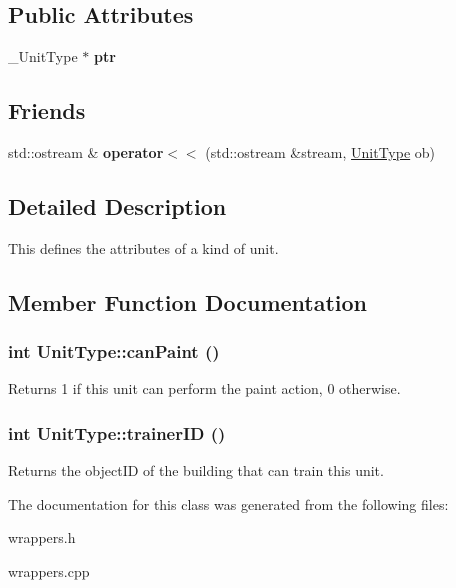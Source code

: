 \subsection*{Public Attributes}
\begin{CompactItemize}
\item 
\hypertarget{classUnitType_42bb83a6d9ad668ce229e4ee19e7ce0b}{
\_\-UnitType $\ast$ \textbf{ptr}}
\label{classUnitType_42bb83a6d9ad668ce229e4ee19e7ce0b}

\end{CompactItemize}
\subsection*{Friends}
\begin{CompactItemize}
\item 
\hypertarget{classUnitType_741d0ed0451b24d98ac791f3f25ad6cd}{
std::ostream \& \textbf{operator$<$$<$} (std::ostream \&stream, \hyperlink{classUnitType}{UnitType} ob)}
\label{classUnitType_741d0ed0451b24d98ac791f3f25ad6cd}

\end{CompactItemize}


\subsection{Detailed Description}
This defines the attributes of a kind of unit. 

\subsection{Member Function Documentation}
\hypertarget{classUnitType_8be8091a55003a0901f30d7600e2d0a6}{
\subsubsection[{canPaint}]{\setlength{\rightskip}{0pt plus 5cm}int UnitType::canPaint ()}}
\label{classUnitType_8be8091a55003a0901f30d7600e2d0a6}


Returns 1 if this unit can perform the paint action, 0 otherwise. \hypertarget{classUnitType_0526f93cb8c905235fd90d0d54c92bf1}{
\subsubsection[{trainerID}]{\setlength{\rightskip}{0pt plus 5cm}int UnitType::trainerID ()}}
\label{classUnitType_0526f93cb8c905235fd90d0d54c92bf1}


Returns the objectID of the building that can train this unit. 

The documentation for this class was generated from the following files:\begin{CompactItemize}
\item 
wrappers.h\item 
wrappers.cpp\end{CompactItemize}

